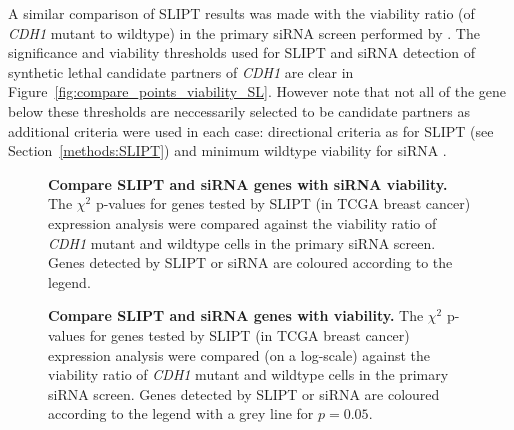 A similar comparison of SLIPT results was made with the viability ratio (of \textit{CDH1} mutant to wildtype) in the primary siRNA screen performed by \citet{Telford2015}. The significance and viability thresholds used for SLIPT and siRNA detection of synthetic lethal candidate partners of \textit{CDH1} are clear in Figure~\ref{fig:compare_points_viability_SL}. However note that not all of the gene below these thresholds are neccessarily selected to be candidate partners as additional criteria were used in each case: directional criteria as for SLIPT (see Section~\ref{methods:SLIPT}) and minimum wildtype viability for siRNA \citep{Telford2015}.

\begin{figure}[!htp]
\begin{mdframed}
\begin{center}
   \end{center}
   \caption[Compare SLIPT and siRNA genes with siRNA viability]{\small \textbf{Compare SLIPT and siRNA genes with siRNA viability.} The $\chi^2$ p-values for genes tested by SLIPT (in TCGA breast cancer) expression analysis were compared against the viability ratio of \textit{CDH1} mutant and wildtype cells in the primary siRNA screen. Genes detected by SLIPT or siRNA are coloured according to the legend. 
}
\label{fig:compare_points_viability_SL}
\end{mdframed}

\begin{mdframed}
\begin{center}
   \end{center}
   \caption[Compare SLIPT and siRNA genes with viability]{\small \textbf{Compare SLIPT and siRNA genes with viability.} The $\chi^2$ p-values for genes tested by SLIPT (in TCGA breast cancer) expression analysis were compared (on a log-scale) against the viability ratio of \textit{CDH1} mutant and wildtype cells in the primary siRNA screen. Genes detected by SLIPT or siRNA are coloured according to the legend with a grey line for $p=0.05$.
}
\label{fig:compare_pval_points_correlation_SL}
\end{mdframed}
\end{figure}

